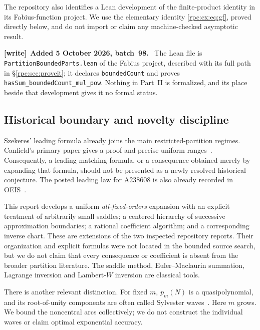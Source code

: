 \documentclass[11pt]{article}
\theoremstyle{definition}
\theoremstyle{remark}
\numberwithin{equation}{section}
\newenvironment{writenote}[1][]{\par\smallskip\begingroup\small
 \noindent\textbf{[write]}\if\relax\detokenize{#1}\relax\else~\textbf{#1.}\fi\ }%
 {\par\endgroup\smallskip}
\begin{document}
The repository also identifies a Lean development of the finite-product
identity in its Fabius-function project. We use the elementary identity
\eqref{rpc:cx:eq:gf}, proved directly below, and do not import or claim any
machine-checked asymptotic result.
\begin{writenote}[Added 5 October 2026, batch~98]
The Lean file is \nolinkurl{PartitionBoundedParts.lean} of the Fabius
project, described with its full path in \S\ref{rpc:sec:proveit}; it
declares \texttt{boundedCount} and proves
\texttt{hasSum\_boundedCount\_mul\_pow}.
Nothing in Part~II is formalized, and its place beside that development
gives it no formal status.
\end{writenote}

\subsection{Historical boundary and novelty discipline}
Szekeres' leading formula already joins the main restricted-partition
regimes. Canfield's primary paper gives a proof and precise uniform
ranges~\cite{canfield}. Consequently, a leading matching formula, or a
consequence obtained merely by expanding that formula, should not be
presented as a newly resolved historical conjecture. The posted leading
law for A238608 is also already recorded in OEIS~\cite{oeis238608}.

This report develops a uniform \emph{all-fixed-orders} expansion with an
explicit treatment of arbitrarily small saddles; a centered hierarchy
of successive approximation boundaries; a rational coefficient
algorithm; and a corresponding inverse chart. These are extensions of
the two inspected repository reports. Their organization and explicit
formulas were not located in the bounded source search, but we do not
claim that every consequence or coefficient is absent from the broader
partition literature. The saddle method, Euler--Maclaurin summation,
Lagrange inversion and Lambert-$W$ inversion are classical tools.

There is another relevant distinction. For fixed $m$, $p_m(N)$ is a
quasipolynomial, and its root-of-unity components are often called
Sylvester waves~\cite{sillszeilberger,osullivan}. Here $m$ grows. We bound the
noncentral arcs collectively; we do not construct the individual waves
or claim optimal exponential accuracy.
\end{document}
